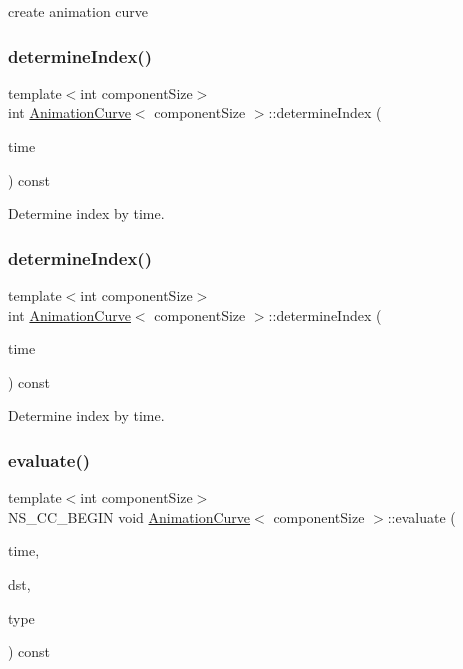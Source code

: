 create animation curve \mbox{\label{classAnimationCurve_ac8ea5fa04e806eb0abf318111ac6c62f}} 
\subsubsection{\texorpdfstring{determine\+Index()}{determineIndex()}\hspace{0.1cm}{\footnotesize\ttfamily [1/2]}}
{\footnotesize\ttfamily template$<$int component\+Size$>$ \\
int \hyperlink{classAnimationCurve}{Animation\+Curve}$<$ component\+Size $>$\+::determine\+Index (\begin{DoxyParamCaption}\item[{float}]{time }\end{DoxyParamCaption}) const}

Determine index by time. \mbox{\label{classAnimationCurve_ac8ea5fa04e806eb0abf318111ac6c62f}} 
\subsubsection{\texorpdfstring{determine\+Index()}{determineIndex()}\hspace{0.1cm}{\footnotesize\ttfamily [2/2]}}
{\footnotesize\ttfamily template$<$int component\+Size$>$ \\
int \hyperlink{classAnimationCurve}{Animation\+Curve}$<$ component\+Size $>$\+::determine\+Index (\begin{DoxyParamCaption}\item[{float}]{time }\end{DoxyParamCaption}) const}

Determine index by time. \mbox{\label{classAnimationCurve_ae66924d40f34253cc7fec8467c5258f4}} 
\subsubsection{\texorpdfstring{evaluate()}{evaluate()}\hspace{0.1cm}{\footnotesize\ttfamily [1/2]}}
{\footnotesize\ttfamily template$<$int component\+Size$>$ \\
N\+S\+\_\+\+C\+C\+\_\+\+B\+E\+G\+IN void \hyperlink{classAnimationCurve}{Animation\+Curve}$<$ component\+Size $>$\+::evaluate (\begin{DoxyParamCaption}\item[{float}]{time,  }\item[{float $\ast$}]{dst,  }\item[{\hyperlink{group____3d_ga3c41e728b3058f4688800b2d4d1f5c95}{Evaluate\+Type}}]{type }\end{DoxyParamCaption}) const}

